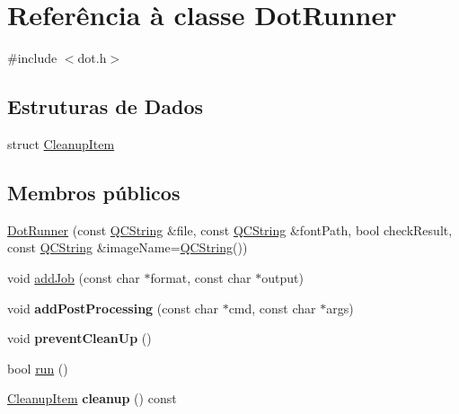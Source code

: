 \hypertarget{class_dot_runner}{\section{Referência à classe Dot\-Runner}
\label{class_dot_runner}
}


{\ttfamily \#include $<$dot.\-h$>$}

\subsection*{Estruturas de Dados}
\begin{DoxyCompactItemize}
\item 
struct \hyperlink{struct_dot_runner_1_1_cleanup_item}{Cleanup\-Item}
\end{DoxyCompactItemize}
\subsection*{Membros públicos}
\begin{DoxyCompactItemize}
\item 
\hyperlink{class_dot_runner_a312875d6d56dd6a78ed071ed03006441}{Dot\-Runner} (const \hyperlink{class_q_c_string}{Q\-C\-String} \&file, const \hyperlink{class_q_c_string}{Q\-C\-String} \&font\-Path, bool check\-Result, const \hyperlink{class_q_c_string}{Q\-C\-String} \&image\-Name=\hyperlink{class_q_c_string}{Q\-C\-String}())
\item 
void \hyperlink{class_dot_runner_a665457eb869b66c8cc35d52795f94a35}{add\-Job} (const char $\ast$format, const char $\ast$output)
\item 
\hypertarget{class_dot_runner_a7b47144dbd469da37be13635f32382c5}{void {\bfseries add\-Post\-Processing} (const char $\ast$cmd, const char $\ast$args)}\label{class_dot_runner_a7b47144dbd469da37be13635f32382c5}

\item 
\hypertarget{class_dot_runner_a80bc7660f0979c68949cfd909a0ac413}{void {\bfseries prevent\-Clean\-Up} ()}\label{class_dot_runner_a80bc7660f0979c68949cfd909a0ac413}

\item 
bool \hyperlink{class_dot_runner_a149ad6701e3e2414cb566bb414029841}{run} ()
\item 
\hypertarget{class_dot_runner_a6581b49f8f6769894c5dab70d6a6f622}{\hyperlink{struct_dot_runner_1_1_cleanup_item}{Cleanup\-Item} {\bfseries cleanup} () const }\label{class_dot_runner_a6581b49f8f6769894c5dab70d6a6f622}

\end{DoxyCompactItemize}


